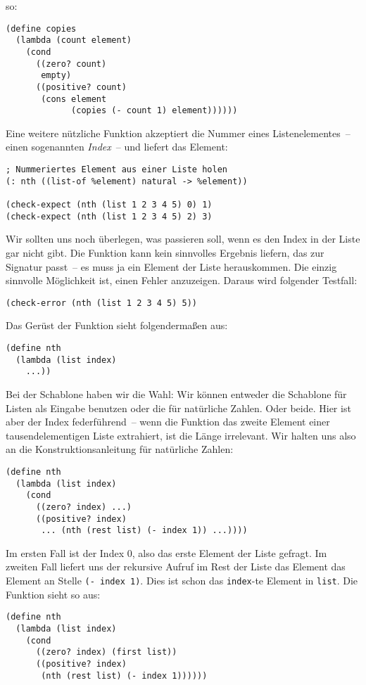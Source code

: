so:
%
\begin{lstlisting}
(define copies
  (lambda (count element)
    (cond
      ((zero? count)
       empty)
      ((positive? count)
       (cons element
             (copies (- count 1) element))))))
\end{lstlisting}
%
Eine weitere nützliche Funktion akzeptiert die Nummer eines
Listenelementes~-- einen sogenannten \textit{Index}~--
und liefert das Element:
%
\begin{lstlisting}
; Nummeriertes Element aus einer Liste holen
(: nth ((list-of %element) natural -> %element))

(check-expect (nth (list 1 2 3 4 5) 0) 1)
(check-expect (nth (list 1 2 3 4 5) 2) 3)
\end{lstlisting}
%
Wir sollten uns noch überlegen, was passieren soll, wenn es den Index in der Liste gar
nicht gibt.  Die Funktion kann kein sinnvolles Ergebnis liefern, das
zur Signatur passt~-- es muss ja ein Element der Liste herauskommen.
Die einzig sinnvolle Möglichkeit ist, einen Fehler anzuzeigen.
Daraus wird folgender Testfall:
%
\begin{lstlisting}
(check-error (nth (list 1 2 3 4 5) 5))
\end{lstlisting}
%
Das Gerüst der Funktion sieht folgendermaßen aus:
%
\begin{lstlisting}
(define nth
  (lambda (list index)
    ...))
\end{lstlisting}
%
Bei der Schablone haben wir die Wahl: Wir können entweder die
Schablone für Listen als Eingabe benutzen oder die für natürliche
Zahlen.  Oder beide.  Hier ist aber der Index federführend~-- wenn die
Funktion das zweite Element einer tausendelementigen Liste extrahiert,
ist die Länge irrelevant.  Wir halten uns also an die
Konstruktionsanleitung für natürliche Zahlen:
%
\begin{lstlisting}
(define nth
  (lambda (list index)
    (cond
      ((zero? index) ...)
      ((positive? index)
       ... (nth (rest list) (- index 1)) ...))))
\end{lstlisting}
%
Im ersten Fall ist der Index 0, also das erste Element der Liste
gefragt.  Im zweiten Fall liefert uns der rekursive Aufruf im Rest der
Liste das Element das Element an Stelle \lstinline{(- index 1)}.  Dies
ist schon das \lstinline{index}-te Element in \lstinline{list}.  Die
Funktion sieht so aus:
%
\begin{lstlisting}
(define nth
  (lambda (list index)
    (cond
      ((zero? index) (first list))
      ((positive? index)
       (nth (rest list) (- index 1))))))
\end{lstlisting}
